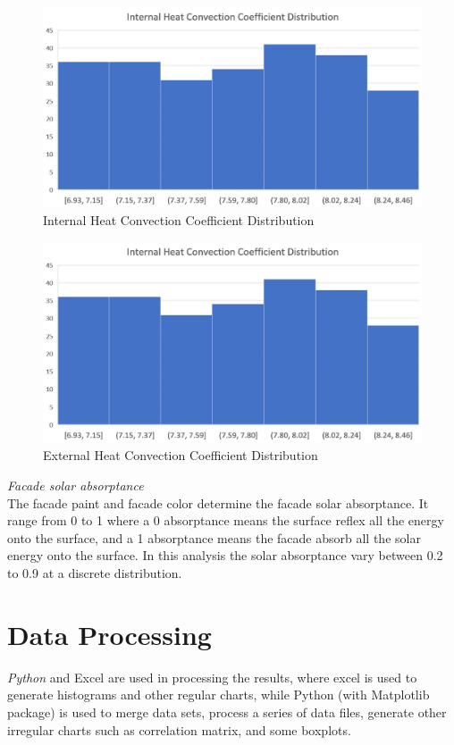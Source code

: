 \documentclass[a4paper, oneside]{discothesis}
\begin{document}
			\begin{figure}[ht!]
			\centering
			\includegraphics[scale=0.35]{Hongger_InConvDist.jpg}
			\caption{Internal Heat Convection Coefficient Distribution}
			\label{fig:HonggerIntConvDist}
			\end{figure}
			
			\begin{figure}[ht!]
			\centering
			\includegraphics[scale=0.35]{Hongger_InConvDist.jpg}
			\caption{External Heat Convection Coefficient Distribution}
			\label{fig:HonggerExtConvDist}
			\end{figure}
			
		\textit{Facade solar absorptance}\\
			The facade paint and facade color determine the facade solar absorptance. It range from 0 to 1 where a 0 absorptance means the surface reflex all the energy onto the surface, and a 1 absorptance means the facade absorb all the solar energy onto the surface. In this analysis the solar absorptance vary between 0.2 to 0.9 at a discrete distribution.

	\section{Data Processing}
		\textit{Python} and Excel are used in processing the results, where excel is used to generate histograms and other regular charts, while Python (with Matplotlib package) is used to merge data sets, process a series of data files, generate other irregular charts such as correlation matrix, and some boxplots.
\end{document}
